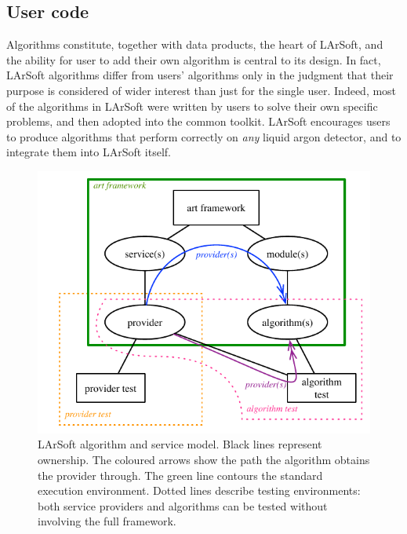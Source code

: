 \subsection{User code}
\label{ssec:Development:UserCode}

Algorithms constitute, together with data products, the heart of LArSoft,
and the ability for user to add their own algorithm is central to its design.
In fact, LArSoft algorithms differ from users' algorithms
only in the judgment that their purpose is considered of wider interest
than just for the single user.
Indeed, most of the algorithms in LArSoft were written by users to solve their own specific problems,
and then adopted into the common toolkit.
LArSoft encourages users to produce algorithms that perform correctly on \emph{any} liquid argon detector,
and to integrate them into LArSoft itself.

\begin{figure}
   \centering
   \includegraphics{figures/LArSoftFactorizationModelAndTests}
   \caption{\label{fig:AlgorithmModel}LArSoft algorithm and service model.
      Black lines represent ownership.
      The coloured arrows show the path the algorithm obtains the provider through.
      The green line contours the standard execution environment.
      Dotted lines describe testing environments:
      both service providers and algorithms can be tested without involving the full framework.
   }
\end{figure}

